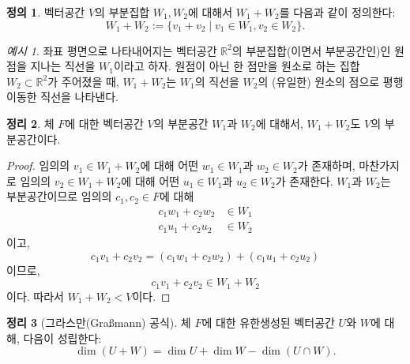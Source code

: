 \documentclass[unfonts,oneside,a4paper]{oblivoir}
\theoremstyle{definition}
\newtheorem{definition}{정의}[section]
\theoremstyle{theorem}
\newtheorem{theorem}[definition]{정리}
\theoremstyle{theorem}
\theoremstyle{remark}
\theoremstyle{remark}
\theoremstyle{remark}
\newtheorem*{example}{예시}
\theoremstyle{remark}
\renewcommand{\vec}[1]{\bm{\mathit{#1}}}
\begin{document}
\begin{definition}
    벡터공간 $V$의 부분집합 $W_1, W_2$에 대해서 $W_1 + W_2$를 다음과 같이 정의한다:
    \[
        W_1 + W_2 := \{\vec v_1 + \vec v_2 \mid \vec v_1 \in W_1, \vec v_2 \in W_2\}.
    \]
\end{definition}

\begin{example}
    좌표 평면으로 나타내어지는 벡터공간 $\mathbb R^2$의 부분집합(이면서 부분공간인)인 원점을 지나는 직선을 $W_1$이라고 하자.
    원점이 아닌 한 점만을 원소로 하는 집합 $W_2 \subset \mathbb R^2$가 주어졌을 때, $W_1 + W_2$는 $W_1$의 직선을 $W_2$의 (유일한) 원소의 점으로 평행 이동한 직선을 나타낸다.
\end{example}

\begin{theorem} \label{thm:addition}
    체 $F$에 대한 벡터공간 $V$의 부분공간 $W_1$과 $W_2$에 대해서, $W_1 + W_2$도 $V$의 부분공간이다.
\end{theorem}

\begin{proof}
    임의의 $\vec v_1 \in W_1 + W_2$에 대해 어떤 $\vec w_1 \in W_1$과 $\vec w_2 \in W_2$가 존재하며, 마찬가지로 임의의 $\vec v_2 \in W_1 + W_2$에 대해 어떤 $\vec u_1 \in W_1$과 $\vec u_2 \in W_2$가 존재한다.
    $W_1$과 $W_2$는 부분공간이므로 임의의 $c_1, c_2 \in F$에 대해
    \begin{align*}
        c_1 \vec w_1 + c_2 \vec w_2 &\in W_1\\
        c_1 \vec u_1 + c_2 \vec u_2 &\in W_2
    \end{align*}
    이고,
    \begin{equation*}
        c_1 \vec v_1 + c_2 \vec v_2 = (c_1 \vec w_1 + c_2 \vec w_2) + (c_1 \vec u_1 + c_2 \vec u_2)
    \end{equation*}
    이므로,
    \begin{equation*}
        c_1 \vec v_1 + c_2 \vec v_2 \in W_1 + W_2
    \end{equation*}
    이다.
    따라서 $W_1 + W_2 < V$이다.
\end{proof}

\begin{theorem}[그라스만(Graßmann) 공식] \label{thm:grassmann}
    체 $F$에 대한 유한생성된 벡터공간 $U$와 $W$에 대해, 다음이 성립한다:
    \begin{equation*}
        \dim (U + W) = \dim U + \dim W - \dim (U \cap W).
    \end{equation*}
\end{theorem}
\end{document}

